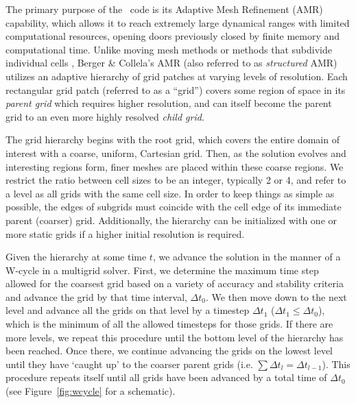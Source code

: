 The primary purpose of the \enzo\ code is its Adaptive Mesh Refinement (AMR)
capability, which allows it to reach extremely large dynamical ranges
with limited computational resources, opening doors previously closed
by finite memory and computational time. Unlike moving mesh methods
\citep{1995ApJS..100..269P,1995ApJS...97..231G} or  
methods that subdivide 
individual cells \citep{Adjerid}, Berger \& Collela's AMR (also referred 
to as \emph{structured} AMR) utilizes an adaptive hierarchy of grid 
patches at varying levels of resolution.  Each rectangular grid patch 
(referred to as a ``grid'') covers some region of space in its 
\emph{parent grid} which requires higher resolution, and can itself 
become the parent grid to an even more highly resolved \emph{child grid}. 

The grid hierarchy begins with the root grid, which covers the entire
domain of interest with a coarse, uniform, Cartesian grid. Then, as
the solution evolves and interesting regions form, finer meshes are
placed within these coarse regions.
 We restrict the ratio
between cell sizes to be an integer, typically 2 or 4, and refer to a
level as all grids with the same cell size.  In order to keep
things as simple as possible, the edges of subgrids must coincide with
the cell edge of its immediate parent (coarser) grid. Additionally,
the hierarchy can be initialized with one or more static grids if a
higher initial resolution is required.

Given the hierarchy at some time $t$, we advance the solution in the
manner of a W-cycle in a multigrid solver.  First, we determine the
maximum time step allowed for the coarsest grid based on a variety of
accuracy and stability criteria and advance the grid by that time
interval, $\Delta t_0$.  We then move down to the next level and
advance all the grids on that level by a timestep $\Delta t_1$
($\Delta t_1 \leq \Delta t_0$), which is the minimum of all the allowed
timesteps for those grids.  If there are more levels, we repeat this
procedure until the bottom level of the hierarchy has been reached.
Once there, we continue advancing the grids on the lowest level until
they have `caught up' to the coarser parent grids (i.e. $\sum
\Delta t_l = \Delta t_{l-1}$).  This procedure repeats itself until
all grids have been advanced by a total time of $\Delta t_0$ (see
Figure~\ref{fig:wcycle} for a schematic).

